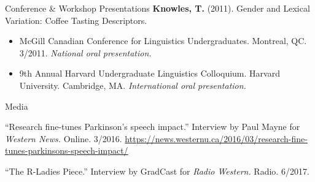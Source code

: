 \documentclass{resume} %
\begin{document}
\begin{rSection}{Conference \& Workshop Presentations}
	{\bf Knowles, T.} (2011). Gender and Lexical Variation: Coffee Tasting Descriptors. 
	\begin{itemize}
				\renewcommand\labelitemi{$\cdot$}
		\item McGill Canadian Conference for Linguistics Undergraduates. Montreal, QC. 3/2011. \emph{National oral presentation.}
		\item 9th Annual Harvard Undergraduate Linguistics Colloquium. Harvard University. Cambridge, MA. \emph{International oral presentation.}
	\end{itemize}

\end{rSection}


\begin{rSection}{Media}

``Research fine-tunes Parkinson's speech impact.'' Interview by Paul Mayne for \textit{Western News.} Online. 3/2016. \url{https://news.westernu.ca/2016/03/research-fine-tunes-parkinsons-speech-impact/}

``The R-Ladies Piece.'' Interview by GradCast for \textit{Radio Western.} Radio. 6/2017.

\end{rSection}


\end{document}
